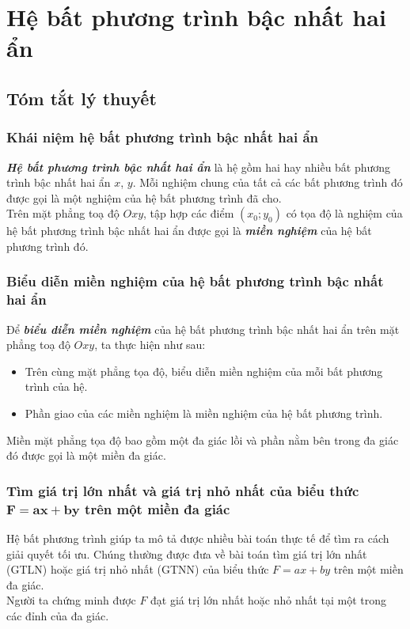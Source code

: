 \section{Hệ bất phương trình bậc nhất hai ẩn}
\setcounter{dang}{0}
\subsection{Tóm tắt lý thuyết}
\subsubsection{Khái niệm hệ bất phương trình bậc nhất hai ẩn}
\begin{boxdn}
	\textbf{\textit{Hệ bất phương trình bậc nhất hai ẩn}} là hệ gồm hai hay nhiều bất phương trình bậc nhất hai ẩn $x$, $y$. Mỗi nghiệm chung của tất cả các bất phương trình đó được gọi là một nghiệm của hệ bất phương trình đã cho.\\
	Trên mặt phẳng toạ độ $Oxy$, tập hợp các điểm $(x_0;y_0)$ có tọa độ là nghiệm của hệ bất phương trình bậc nhất hai ẩn được gọi là \textbf{\textit{miền nghiệm}} của hệ bất phương trình đó.
\end{boxdn}
\subsubsection{Biểu diễn miền nghiệm của hệ bất phương trình bậc nhất hai ẩn}
\begin{boxdn}
	Để \textbf{\textit{biểu diễn miền nghiệm}} của hệ bất phương trình bậc nhất hai ẩn trên mặt phẳng toạ độ $Oxy$, ta thực hiện như sau:
	\begin{itemize}
	\item Trên cùng mặt phẳng tọa độ, biểu diễn miền nghiệm của mỗi bất phương trình của hệ.
	\item Phần giao của các miền nghiệm là miền nghiệm của hệ bất phương trình.
	\end{itemize}
\end{boxdn}
\begin{note}
	Miền mặt phẳng tọa độ bao gồm một đa giác lồi và phần nằm bên trong đa giác đó được gọi là một miền đa giác.
\end{note}
\subsubsection{Tìm giá trị lớn nhất và giá trị nhỏ nhất của biểu thức $\mathbf{F=ax+by}$ trên một miền đa giác}
Hệ bất phương trình giúp ta mô tả được nhiều bài toán thực tế để tìm ra cách giải quyết tối ưu. Chúng thường được đưa về bài toán tìm giá trị lớn nhất (GTLN) hoặc giá trị nhỏ nhất (GTNN) của biểu thức $F=ax+by$ trên một miền đa giác.\\
Người ta chứng minh được $F$ đạt giá trị lớn nhất hoặc nhỏ nhất tại một trong các đỉnh của đa giác.

